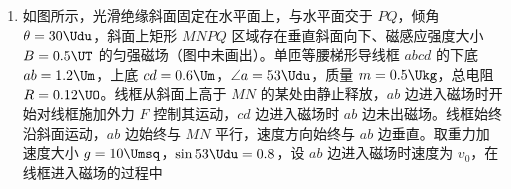 \documentclass[\gkver]{gaokaozhenti}
\begin{document}
\begin{enumerate}
{可知排球一定下网，故 A 正确；

B．设球抛出时与水平方向的夹角为 $ \alpha $（$ 0 \leq \alpha \leq 90^\circ $），落地时速度为 $ v' $，画出速度的矢量三角形，如图所示


在矢量三角形 $ ABC $ 中，面积 $ S = \frac{1}{2} g t \cdot v_0 \cos \alpha $

水平位移 $ x = v_0 \cos \alpha \cdot t $

联立可得 $ S = \frac{1}{2} g x $

即三角形面积最大时，水平位移最大，又 $ S = \frac{1}{2} v_0 v' \sin \beta $

根据动能定理可知落地时速度 $ v' $ 为定值，$ v_0 $ 也为定值，当 $ \sin \beta = 1 $ 即 $ \beta = 90^\circ $ 时，$ S $ 有最大值，即末速度方向与初速度方向垂直时，水平位移有最大值，显然当球水平抛出时，末速度方向与初速度方向夹角为小于 $ 90^\circ $，根据数学知识可知，保持 $ v $、$ x $、$ h $ 不变，增大 $ \theta $，排球的水平射程先增大后减小，可知排球可能会出界，故 B 错误；

C．保持 $ \theta $ 不变，增大 $ x $ 同时减小 $ h $，根据 $ h = \frac{1}{2} g t_1^2 $ 可知球抛出到网顶点的时间变小，要能过网，则需要增大初速度，设恰好能过网的初速度为 $ v'' $，设网高为 $ H $，球到网顶点竖直方向的速度 $ v_y = g t_1 $ 变小，过网后，竖直方向根据 $ H = v_y t'' + \frac{1}{2} g t''^2 $ 可知球运动的时间比增大 $ x $ 同时减小 $ h $ 前长，水平方向 $ x'' = v'' t'' $ 的位移比增大 $ x $ 同时减小 $ h $ 前大，故一定会出界，故 C 正确；

D．保持 $ x $、$ h $ 不变，同时增大 $ v $ 和 $ \theta $，则球竖直向上向的初速度不为零，根据 $ h = -v_{y0} t' + \frac{1}{2} g t'^2 $ 可知时间变大，故 D 错误。

故选 AC。
}
\item
如图所示，光滑绝缘斜面固定在水平面上，与水平面交于 $ PQ $，倾角 $ \theta =30 \Udu $，斜面上矩形 $ MNPQ $ 区域存在垂直斜面向下、磁感应强度大小 $ B =0.5\UT $ 的匀强磁场（图中未画出）。单匝等腰梯形导线框 $ abcd $ 的下底 $ ab=1.2 \Um $，上底 $ cd=0.6 \Um $，$ \angle a=53 \Udu $，质量 $ m =0.5 \Ukg $，总电阻 $ R =0.12 \UO $。线框从斜面上高于 $ MN $ 的某处由静止释放，$ ab $ 边进入磁场时开始对线框施加外力 $ F $ 控制其运动，$ cd $ 边进入磁场时 $ ab $ 边未出磁场。线框始终沿斜面运动，$ ab $ 边始终与 $ MN $ 平行，速度方向始终与 $ ab $ 边垂直。取重力加速度大小 $ g =10 \Umsq $，$ \sin 53 \Udu =0.8 $，设 $ ab $ 边进入磁场时速度为 $ v_{0} $，在线框进入磁场的过程中 
\onepicture[w=7.64cm]{}


\end{enumerate}
\end{document}
